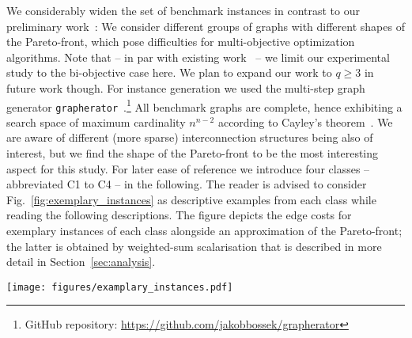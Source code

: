 \documentclass[twoside]{article}
\begin{document}
We considerably widen the set of benchmark instances in contrast to our preliminary work~\citep{BG2017ParetoBeneficial}: We consider different groups of graphs with different shapes of the Pareto-front, which pose difficulties for multi-objective optimization algorithms. 
Note that -- in par with existing work~\citep{KC2001Generators, ZG99} -- we limit our experimental study to the bi-objective case here. We plan to expand our work to $q \ge 3$ in future work though. For instance generation we used the multi-step graph generator \texttt{grapherator}~\citep{B2018grapherator}.\footnote{GitHub repository: \url{https://github.com/jakobbossek/grapherator}} All benchmark graphs are complete, hence exhibiting a search space of maximum cardinality $n^{n-2}$ according to Cayley's theorem~\citep{Cayley1889}. We are aware of different (more sparse) interconnection structures being also of interest, but we find the shape of the Pareto-front to be the most interesting aspect for this study.
For later ease of reference we introduce four classes -- abbreviated C1 to C4 -- in the following. The reader is advised to consider Fig.~\ref{fig:exemplary_instances} as descriptive examples from each class while reading the following descriptions.
The figure depicts the edge costs for exemplary instances of each class alongside an approximation of the Pareto-front; the latter is obtained by weighted-sum scalarisation that is described in more detail in Section~\ref{sec:analysis}.
\begin{figure*}[thb]
  \centering
  \texttt{[image: figures/examplary\_instances.pdf]}
  \caption{Visual examples for each one instance ($n = 25$) of each benchmark graph class C1 to C4 (from left to right). Depicted are scatterplots of the edge weights coloured and sized by their respective occurrence in supported efficient solutions (top row; the lighter/larger, the more frequent) and scatterplots of a Pareto-front approximation (bottom row).}
  \label{fig:exemplary_instances}
\end{figure*}
\end{document}
